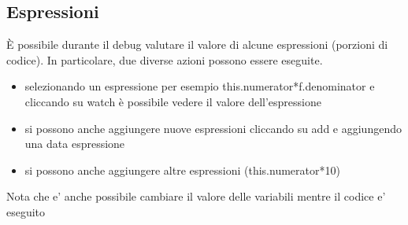 \documentclass{article}
\begin{document}
\subsection{Espressioni}
\`E possibile durante il debug valutare il valore di alcune espressioni (porzioni di codice). In particolare, due diverse azioni possono essere eseguite.

\begin{itemize}
\item selezionando un espressione per esempio this.numerator*f.denominator e cliccando su watch \`e possibile vedere  il valore dell'espressione
\item si possono anche aggiungere nuove espressioni cliccando su add e aggiungendo una data espressione
\item si possono anche aggiungere altre espressioni (this.numerator*10)
\end{itemize}

 Nota che e' anche possibile cambiare il valore delle variabili mentre il codice e' eseguito
\end{document}
